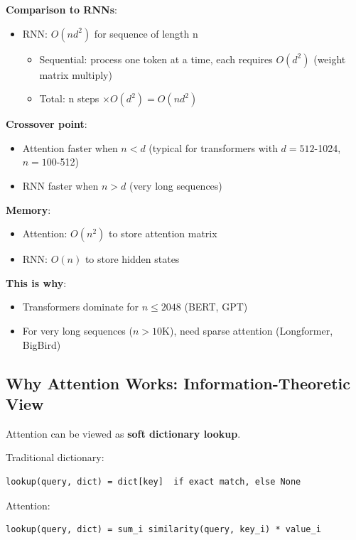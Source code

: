 \textbf{Comparison to RNNs}:
\begin{itemize}
\item RNN: $O(nd^2)$ for sequence of length n
\begin{itemize}
\item Sequential: process one token at a time, each requires $O(d^2)$ (weight matrix multiply)
\item Total: n steps $\times O(d^2) = O(nd^2)$
\end{itemize}
\end{itemize}

\textbf{Crossover point}:
\begin{itemize}
\item Attention faster when $n < d$ (typical for transformers with $d=512$-1024, $n=100$-512)
\item RNN faster when $n > d$ (very long sequences)
\end{itemize}

\textbf{Memory}:
\begin{itemize}
\item Attention: $O(n^2)$ to store attention matrix
\item RNN: $O(n)$ to store hidden states
\end{itemize}

\textbf{This is why}:
\begin{itemize}
\item Transformers dominate for $n \leq 2048$ (BERT, GPT)
\item For very long sequences ($n > 10$K), need sparse attention (Longformer, BigBird)
\end{itemize}

\subsection{Why Attention Works: Information-Theoretic View}

Attention can be viewed as \textbf{soft dictionary lookup}.

Traditional dictionary:
\begin{verbatim}
lookup(query, dict) = dict[key]  if exact match, else None
\end{verbatim}

Attention:
\begin{verbatim}
lookup(query, dict) = sum_i similarity(query, key_i) * value_i
\end{verbatim}

